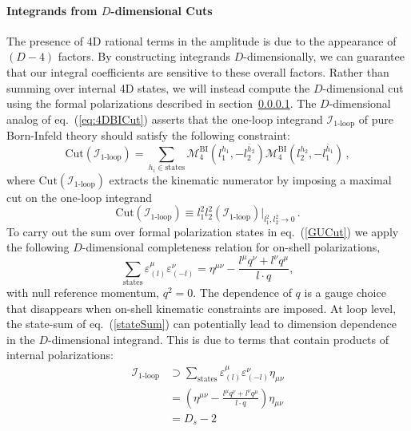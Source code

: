 \documentclass[12pt,letter]{article}
\def\sect#1{section~\ref{#1}}
\def\eqn#1{eq.~(\ref{#1})}
\begin{document}
\paragraph{Integrands from $D$-dimensional Cuts}
The presence of 4D rational terms in the amplitude is due to the appearance of $(D-4)$ factors. By constructing integrands $D$-dimensionally, we can guarantee that our integral coefficients are sensitive to these overall factors. Rather than summing over internal 4D states, we will instead compute the $D$-dimensional cut using the formal polarizations described in \sect{}. The $D$-dimensional analog of \eqn{eq:4DBICut} asserts that the one-loop integrand $\mathcal{I}_{\text{1-loop}}$ of pure Born-Infeld theory should satisfy the following constraint:
\begin{equation}
\label{GUCut}
\text{Cut}( \mathcal{I}_{\text{1-loop}}) = \sum_{h_i\in \text{states}} \mathcal{M}^{\text{BI}}_4(l_1^{h_1},-l_2^{\bar{h}_2})\mathcal{M}^{\text{BI}}_4(l_2^{h_2},-l_1^{\bar{h}_1})\,,
\end{equation}  
where $\text{Cut}( \mathcal{I}_{\text{1-loop}}) $ extracts the kinematic numerator by imposing a maximal cut on the one-loop integrand 
\begin{equation}
\text{Cut}( \mathcal{I}_{\text{1-loop}})  \equiv l_1^2l_2^2(\mathcal{I}_{\text{1-loop}})\Big|_{l_1^2,l_2^2\rightarrow 0}\,.
\end{equation}
To carry out the sum over formal polarization states in \eqn{GUCut} we apply the following $D$-dimensional completeness relation for on-shell polarizations,
\begin{equation}\label{stateSum}
\sum_{\text{states}}\varepsilon^\mu_{(l)}\varepsilon^\nu_{(-l)} = \eta^{\mu\nu} - \frac{l^\mu q^\nu+l^\nu q^\mu}{l\cdot q},
\end{equation}
with null reference momentum, $q^2=0$. The dependence of $q$ is a gauge choice that disappears when on-shell kinematic constraints are imposed. At loop level, the state-sum of \eqn{stateSum} can potentially lead to dimension dependence in the $D$-dimensional integrand. This is due to terms that contain products of internal polarizations:
\begin{equation}
\begin{aligned}
 \mathcal{I}_{\text{1-loop}} &\supset \sum_{ \text{states}} \varepsilon^\mu_{(l)}\varepsilon^\nu_{(-l)} \eta_{\mu\nu}
 \\
 &=\left(\eta^{\mu\nu} - \frac{l^\mu q^\nu+l^\nu q^\mu}{l\cdot q}\right) \eta_{\mu\nu}
 \\
 &=D_s-2
 \end{aligned}
\end{equation}
\end{document}
